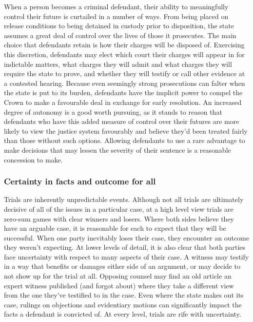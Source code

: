 When a person becomes a criminal defendant, their ability to meaningfully control their future is curtailed in a number of ways. From being placed on release conditions to being detained in custody prior to disposition, the state assumes a great deal of control over the lives of those it prosecutes. The main choice that defendants retain is how their charges will be disposed of. Exercising this discretion, defendants may elect which court their charges will appear in for indictable matters, what charges they will admit and what charges they will require the state to prove, and whether they will testify or call other evidence at a contested hearing. Because even seemingly strong prosecutions can falter when the state is put to its burden, defendants have the implicit power to compel the Crown to make a favourable deal in exchange for early resolution. An increased degree of autonomy is a good worth pursuing, as it stands to reason that defendants who have this added measure of control over their futures are more likely to view the justice system favourably and believe they'd been treated fairly than those without such options. Allowing defendants to use a rare advantage to make decisions that may lessen the severity of their sentence is a reasonable concession to make.

\subsubsection{Certainty in facts and outcome for all}

Trials are inherently unpredictable events. Although not all trials are ultimately decisive of all of the issues in a particular case, at a high level view trials are zero-sum games with clear winners and losers. Where both sides believe they have an arguable case, it is reasonable for each to expect that they will be successful. When one party inevitably loses their case, they encounter an outcome they weren't expecting. At lower levels of detail, it is also clear that both parties face uncertainty with respect to many aspects of their case. A witness may testify in a way that benefits or damages either side of an argument, or may decide to not show up for the trial at all. Opposing counsel may find an old article an expert witness published (and forgot about) where they take a different view from the one they've testified to in the case. Even where the state makes out its case, rulings on objections and evidentiary motions can significantly impact the facts a defendant is convicted of. At every level, trials are rife with uncertainty.

